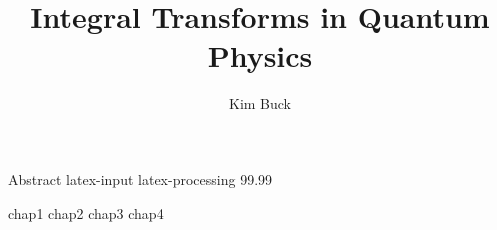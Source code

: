 \documentclass[
    11pt                                %
]{book}  %
\author                 {Kim Buck}
\title                  {Integral Transforms in Quantum Physics}
\begin{document}
\titlepage                              %
 {Abstract}          %
 {latex-input}                  %
 {latex-processing}             %
\dedicationpage                         %
\tableofcontents                        %
\settowidth {\fignumwidth} {99.99}
\listoffigures                          %
\listoftables                           %
%





\uumaintext     %

 {chap1}
 {chap2}
 {chap3}
 {chap4}

\appendix       %
\end{document}
